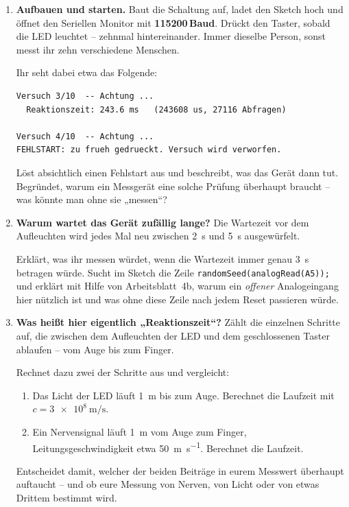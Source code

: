 \documentclass[a4paper,12pt]{scrartcl}
\begin{document}
\begin{enumerate}[leftmargin=2em, resume, itemsep=9pt, topsep=7pt]
\item \textbf{Aufbauen und starten.} Baut die Schaltung auf, ladet den Sketch hoch und öffnet den
Seriellen Monitor mit \textbf{115200\,Baud}. Drückt den Taster, sobald die LED leuchtet -- zehnmal
hintereinander. Immer dieselbe Person, sonst messt ihr zehn verschiedene Menschen.

\smallskip
\noindent\begin{minipage}{\linewidth}
Ihr seht dabei etwa das Folgende:

\begin{lstlisting}[style=monitor]
Versuch 3/10  -- Achtung ...
  Reaktionszeit: 243.6 ms   (243608 us, 27116 Abfragen)

Versuch 4/10  -- Achtung ...
FEHLSTART: zu frueh gedrueckt. Versuch wird verworfen.
\end{lstlisting}
\end{minipage}

\noindent Löst absichtlich einen Fehlstart aus und beschreibt, was das Gerät dann tut. Begründet,
warum ein Messgerät eine solche Prüfung überhaupt braucht -- was könnte man ohne sie „messen``?

\item \textbf{Warum wartet das Gerät zufällig lange?} Die Wartezeit vor dem Aufleuchten wird
jedes Mal neu zwischen \SI{2}{\second} und \SI{5}{\second} ausgewürfelt.

\smallskip
Erklärt, was ihr messen würdet, wenn die Wartezeit immer genau \SI{3}{\second} betragen würde.
Sucht im Sketch die Zeile \texttt{randomSeed(analogRead(A5));} und erklärt mit Hilfe von
Arbeitsblatt~4b, warum ein \emph{offener} Analogeingang hier nützlich ist und was ohne diese Zeile
nach jedem Reset passieren würde.

\item \textbf{Was heißt hier eigentlich „Reaktionszeit``?} Zählt die einzelnen Schritte auf, die
zwischen dem Aufleuchten der LED und dem geschlossenen Taster ablaufen -- vom Auge bis zum Finger.

\smallskip
Rechnet dazu zwei der Schritte aus und vergleicht:
  \begin{enumerate}[label=(\alph*), leftmargin=2em, itemsep=6pt, topsep=5pt]
  \item Das Licht der LED läuft \SI{1}{\meter} bis zum Auge. Berechnet die Laufzeit mit
        $c=\SI{3e8}{\meter\per\second}$.
  \item Ein Nervensignal läuft \SI{1}{\meter} vom Auge zum Finger, Leitungsgeschwindigkeit
        etwa \SI{50}{\meter\per\second}. Berechnet die Laufzeit.
  \end{enumerate}
Entscheidet damit, welcher der beiden Beiträge in eurem Messwert überhaupt auftaucht -- und ob
eure Messung von Nerven, von Licht oder von etwas Drittem bestimmt wird.
\end{enumerate}
\end{document}
